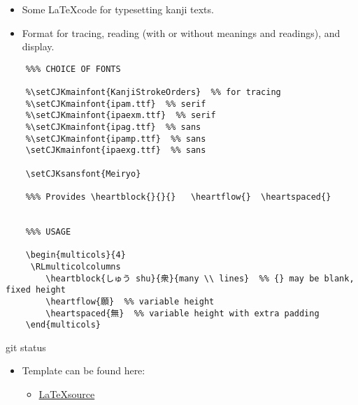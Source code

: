 \documentclass[letterpaper]{article}
\begin{document}
	\vspace*{3cm}
	
	

	\vspace*{2cm}
	    
	    \begin{itemize}
	    	\item[]  Some \LaTeX code for typesetting kanji texts.
	    	\item[] Format for tracing, reading (with or without meanings and readings), and display.
	    \end{itemize}
	    
	    
	    
	
	\vspace*{1cm}
	
	
	\begin{verbatim}
	%%% CHOICE OF FONTS
	
	%\setCJKmainfont{KanjiStrokeOrders}  %% for tracing 
	%\setCJKmainfont{ipam.ttf}  %% serif
	%\setCJKmainfont{ipaexm.ttf}  %% serif
	%\setCJKmainfont{ipag.ttf}  %% sans
	%\setCJKmainfont{ipamp.ttf}  %% sans
	\setCJKmainfont{ipaexg.ttf}  %% sans
	
	\setCJKsansfont{Meiryo}
	
	%%% Provides \heartblock{}{}{}   \heartflow{}  \heartspaced{}
	
	
	%%% USAGE
	
	\begin{multicols}{4}
	 \RLmulticolcolumns
	    \heartblock{しゅう shu}{衆}{many \\ lines}  %% {} may be blank, fixed height
	    \heartflow{願}  %% variable height
	    \heartspaced{無}  %% variable height with extra padding
	\end{multicols}
	\end{verbatim}
	
	\vspace*{1cm}
git status	 
	\begin{itemize}
		
			\item[] {\Large Template can be found here:}
			\begin{itemize}
			 \item[] \href{https://github.com/gwmatthews/TheFourVows/blob/main/the-four-vows.tex}{\LaTeX source}
			 
		\end{itemize}
	\end{itemize}
	
\end{document}
